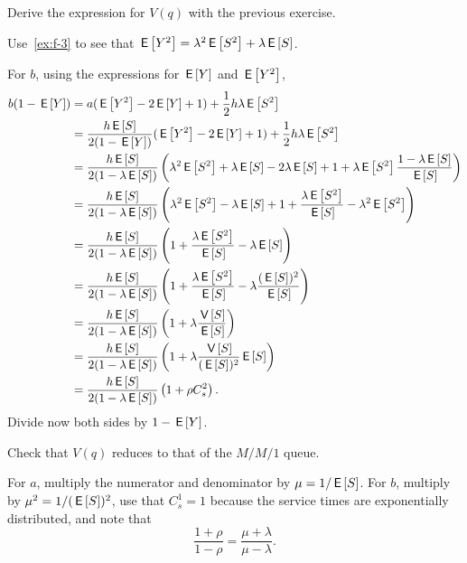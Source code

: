 \begin{exercise}\label{ex:nm-2}
Derive
 the expression for $V(q)$ with the previous exercise.
\begin{hint}
Use~\cref{ex:f-3} to see that $\E{Y^2} = \lambda^2 \E{S^2} + \lambda \E S$. 
\end{hint}
\begin{solution}
  For $b$, using the expressions for $\E Y$ and $\E{Y^2}$, 
\begin{align*}
b(1-\E Y) &= a(\E{Y^2} - 2 \E Y + 1) + \frac 12 h \lambda \E{S^2} \\
&= \frac{h \E S}{2(1-\E Y)} (\E{Y^2} - 2 \E Y + 1) + \frac 12 h \lambda \E{S^2} \\
&= \frac{h \E S}{2(1-\lambda \E S)} \left(\lambda^2 \E{S^2} + \lambda \E S - 2 \lambda \E S + 1 +  \lambda \E{S^2}\frac{1-\lambda \E S}{\E S}\right) \\
&= \frac{h \E S}{2(1-\lambda \E S)} \left(\lambda^2 \E{S^2} - \lambda \E S + 1 +  \frac{\lambda \E{S^2}}{\E S} - \lambda^2 \E{S^2}\right) \\
&= \frac{h \E S}{2(1-\lambda \E S)} \left(1+ \frac{\lambda \E{S^2}}{\E S }  - \lambda \E S \right) \\
&= \frac{h \E S}{2(1-\lambda \E S)} \left( 1+ \frac{\lambda \E{S^2}}{\E S }  - \lambda \frac{(\E S)^2}{\E S}\right) \\
&= \frac{h \E S}{2(1-\lambda \E S)} \left( 1+ \lambda \frac{\V{S}}{\E S }\right)\\
&= \frac{h \E S}{2(1-\lambda \E S)} \left( 1+ \lambda \frac{\V{S}}{(\E S)^2 } \E S\right)\\
&= \frac{h \E S}{2(1-\lambda \E S)} \left( 1+ \rho C_s^2\right).
\end{align*}
Divide now both sides by $1-\E Y$. 
\end{solution}
\end{exercise}

\begin{exercise}
 Check  that $V(q)$ reduces to that of the $M/M/1$ queue. 
\begin{solution}
  For $a$, multiply the numerator and denominator by $\mu=1/ \E S$.
  For $b$, multiply by $\mu^2 = 1/(\E S)^2$, use that $C_s^1=1$ because the service times are exponentially distributed, and note that
  \begin{equation*}
    \frac{1+\rho}{1-\rho} = \frac{\mu + \lambda}{\mu-\lambda}.
  \end{equation*}
\end{solution}
\end{exercise}


